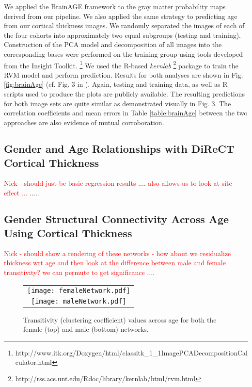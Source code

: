 We applied the BrainAGE framework to the gray matter probability maps derived
from our pipeline.  We also applied the same strategy to predicting age from 
our cortical thickness images.  We randomly separated the images of each of the 
four cohorts into approximately two equal subgroups (testing and training).
Construction of the PCA model and decomposition of all images into the corresponding 
bases were performed on the training group using tools developed from the Insight Toolkit.%
\footnote{
http://www.itk.org/Doxygen/html/classitk\_1\_1ImagePCADecompositionCalculator.html  
}
We used the R-based {\it kernlab}%
\footnote{
http://rss.acs.unt.edu/Rdoc/library/kernlab/html/rvm.html
} 
package to train the RVM model and perform prediction.  Results for both
analyses  are shown in Fig. \ref{fig:brainAge} (cf. Fig. 3 in \cite{franke2010}).
Again, testing and training data, as well as 
R scripts used to produce the 
plots are publicly available.  
The resulting predictions for both image sets are quite similar as demonstrated 
visually in Fig. 3.  The correlation coefficients and mean errors in Table 
\ref{table:brainAge} between the
two approaches are also evidence of mutual corroboration.

\subsection{Gender and Age Relationships with DiReCT Cortical Thickness}

\textcolor{red}{ Nick - should just be basic regression results
  .... also allows us to look at site effect ... }
.....

\subsection{Gender Structural Connectivity Across Age Using Cortical Thickness}


\textcolor{red}{ Nick - should show a rendering of these networks -
  how about we residualize thickness wrt age and then look at the
  difference between male and female transitivity?  we can permute to
  get significance .... } 

\begin{figure*}
  \centering
  \begin{tabular}{c}
  \texttt{[image: femaleNetwork.pdf]} \\
  \texttt{[image: maleNetwork.pdf]}
  \end{tabular}
  \caption{Transitivity (clustering coefficient) values across age for both the female (top)
  and male (bottom) networks.  
  }
  \label{fig:network}
\end{figure*}

